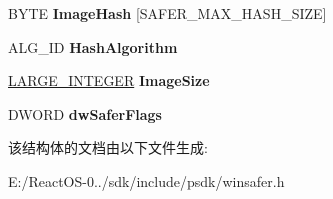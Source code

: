 \begin{DoxyCompactItemize}
B\+Y\+TE {\bfseries Image\+Hash} \mbox{[}S\+A\+F\+E\+R\+\_\+\+M\+A\+X\+\_\+\+H\+A\+S\+H\+\_\+\+S\+I\+ZE\mbox{]}
\item 
\mbox{\label{struct___s_a_f_e_r___h_a_s_h___i_d_e_n_t_i_f_i_c_a_t_i_o_n_a75dd6fc21786807a071e1750df350d7f}} 
A\+L\+G\+\_\+\+ID {\bfseries Hash\+Algorithm}
\item 
\mbox{\label{struct___s_a_f_e_r___h_a_s_h___i_d_e_n_t_i_f_i_c_a_t_i_o_n_accc43eeff58b6dc7ed9a16e8da1452c9}} 
\hyperlink{union___l_a_r_g_e___i_n_t_e_g_e_r}{L\+A\+R\+G\+E\+\_\+\+I\+N\+T\+E\+G\+ER} {\bfseries Image\+Size}
\item 
\mbox{\label{struct___s_a_f_e_r___h_a_s_h___i_d_e_n_t_i_f_i_c_a_t_i_o_n_ae772190467f91b818ed19f6188cfc11d}} 
D\+W\+O\+RD {\bfseries dw\+Safer\+Flags}
\end{DoxyCompactItemize}


该结构体的文档由以下文件生成\+:\begin{DoxyCompactItemize}
\item 
E\+:/\+React\+O\+S-\/0../sdk/include/psdk/winsafer.\+h\end{DoxyCompactItemize}
